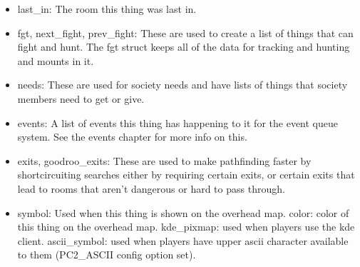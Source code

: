 \begin{itemize}

\item last\_in: The room this thing was last in.

\item fgt, next\_fight, prev\_fight: These are used to create a list of things
  that can fight and hunt. The fgt struct keeps all of the data for tracking
  and hunting and mounts in it.

\item needs: These are used for society needs and have lists of things that
  society members need to get or give.

\item events: A list of events this thing has happening to it for the event
  queue system. See the events chapter for more info on this.


\item exits, goodroo\_exits: These are used to make pathfinding faster by
  shortcircuiting searches either by requiring certain exits, or certain exits
  that lead to rooms that aren't dangerous or hard to pass through.

\item symbol: Used when this thing is shown on the overhead map. color: color
  of this thing on the overhead map. kde\_pixmap: used when players use the kde
  client. ascii\_symbol: used when players have upper ascii character
  available to them (PC2\_ASCII config option set).

\end{itemize}
